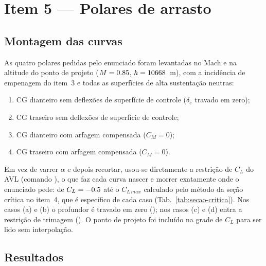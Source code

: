 


\section{Item 5 --- Polares de arrasto}
\label{sec:polares}

\subsection{Montagem das curvas}

As quatro polares pedidas pelo enunciado foram levantadas no Mach e na altitude
do ponto de projeto ($M = 0.85$, $h = 10668$~m), com a incidência de
empenagem do item~3 e todas as superfícies de alta sustentação neutras:

\begin{enumerate}[label=(\alph*)]
  \item CG dianteiro sem deflexões de superfície de controle
  ($\delta_e$ travado em zero);
  \item CG traseiro sem deflexões de superfície de controle;
  \item CG dianteiro com arfagem compensada ($C_M = 0$);
  \item CG traseiro com arfagem compensada ($C_M = 0$).
\end{enumerate}

Em vez de varrer $\alpha$ e depois recortar, usou-se diretamente a restrição de
$C_L$ do AVL (comando ), o que faz cada curva nascer e morrer
exatamente onde o enunciado pede: de $C_L = -0.5$ até o $C_{L\,max}$
calculado pelo método da seção crítica no item~4, que é específico de cada
caso (Tab.~\ref{tab:secao-critica}). Nos casos (a) e (b) o profundor é travado
em zero (); nos casos (c) e (d) entra a restrição de trimagem
(). O ponto de projeto foi incluído na grade de $C_L$ para ser
lido sem interpolação.

\subsection{Resultados}

